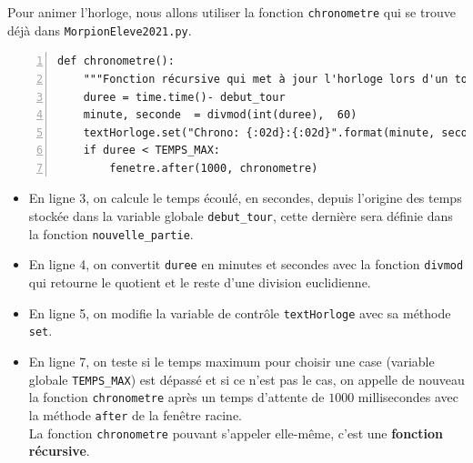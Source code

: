 \documentclass[a4paper, french, 12pt]{article}  %
\newcounter{def}
\begin{document}
Pour animer l'horloge, nous allons utiliser la fonction \lstinline+chronometre+ qui se trouve déjà dans \texttt{MorpionEleve2021.py}.





\begin{lstlisting}[numbers=left]
def chronometre():
    """Fonction récursive qui met à jour l'horloge lors d'un tour"""
    duree = time.time()- debut_tour
    minute, seconde  = divmod(int(duree),  60)
    textHorloge.set("Chrono: {:02d}:{:02d}".format(minute, seconde))
    if duree < TEMPS_MAX:
        fenetre.after(1000, chronometre)
\end{lstlisting}


\begin{itemize}[label=]
	\item En ligne 3, on calcule le temps écoulé, en secondes,  depuis l'origine des temps stockée dans la variable globale \lstinline+debut_tour+, cette dernière sera définie dans la fonction \lstinline+nouvelle_partie+.
	\item En ligne 4, on convertit \lstinline+duree+ en minutes et secondes avec la fonction \lstinline+divmod+ qui retourne le quotient et le reste d'une division euclidienne.
	\item En ligne 5, on modifie la variable de contrôle \lstinline+textHorloge+ avec sa méthode \lstinline+set+. 
	\item En ligne 7, on teste si le temps maximum pour choisir une case (variable  globale \lstinline+TEMPS_MAX+) est dépassé et si ce n'est pas le cas, on appelle de nouveau la fonction \lstinline+chronometre+ après un temps d'attente de $1000$ millisecondes avec la méthode \lstinline+after+ de la fenêtre racine.\\
	La fonction \lstinline+chronometre+  pouvant s'appeler elle-même, c'est une \textbf{fonction récursive}. 
	\end{itemize}
	
\end{document}
